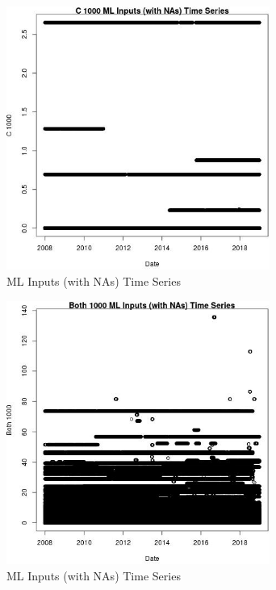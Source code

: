 \begin{figure} 
\centering  
\includegraphics[width=0.77\textwidth]{Code_Outputs/Report_ML_input_PM25_Step4_part_f_de_duplicated_aveswNAs_C_1000vDate.jpg} 
\caption{\label{fig:Report_ML_input_PM25_Step4_part_f_de_duplicated_aveswNAsC_1000vDate}ML Inputs (with NAs) Time Series} 
\end{figure} 
 

\begin{figure} 
\centering  
\includegraphics[width=0.77\textwidth]{Code_Outputs/Report_ML_input_PM25_Step4_part_f_de_duplicated_aveswNAs_Both_1000vDate.jpg} 
\caption{\label{fig:Report_ML_input_PM25_Step4_part_f_de_duplicated_aveswNAsBoth_1000vDate}ML Inputs (with NAs) Time Series} 
\end{figure} 
 

